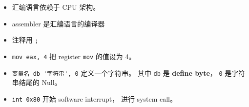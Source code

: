 
\begin{issues}
\issueDraft
\end{issues}

\begin{itemize}
\item 汇编语言依赖于 CPU 架构。
\item assembler 是汇编语言的编译器
\item 注释用 \verb|;|
\item \verb|mov eax, 4| 把 register \verb|mov| 的值设为 4。
\item \verb|变量名 db '字符串', 0| 定义一个字符串。 其中 \verb|db| 是 \textbf{define byte}， \verb|0| 是字符串结尾的 Null。
\item \verb|int 0x80| 开始 software interrupt， 进行 system call。
\end{itemize}
